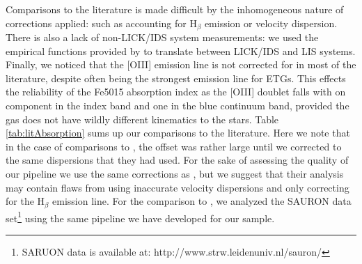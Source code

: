 	Comparisons to the literature is made difficult by the inhomogeneous nature of corrections applied: such as accounting for H$_\beta$ emission or velocity dispersion. There is also a lack of non-LICK/IDS system measurements: we used the empirical functions provided by \citet{} to translate between LICK/IDS and LIS systems. Finally, we noticed that the [OIII] emission line is not corrected for in most of the literature, despite often being the strongest emission line for ETGs. This effects the reliability of the Fe5015 absorption index as the [OIII] doublet falls with on component in the index band and one in the blue continuum band, provided the gas does not have wildly different kinematics to the stars. Table \ref{tab:litAbsorption} sums up our comparisons to the literature. Here we note that in the case of comparisons to \citet{Rampazzo2005}, the offset was rather large until we corrected to the same dispersions that they had used. For the sake of assessing the quality of our pipeline we use the same corrections as \citet{Rampazzo2005}, but we suggest that their analysis may contain flaws from using inaccurate velocity dispersions and only correcting for the H$_\beta$ emission line. For the comparison to \citet{Vazdekis2010}, we analyzed the SAURON data set\footnote{SARUON data is available at: http://www.strw.leidenuniv.nl/sauron/} \citep{Emsellem2004} using the same pipeline we have developed for our sample. 


